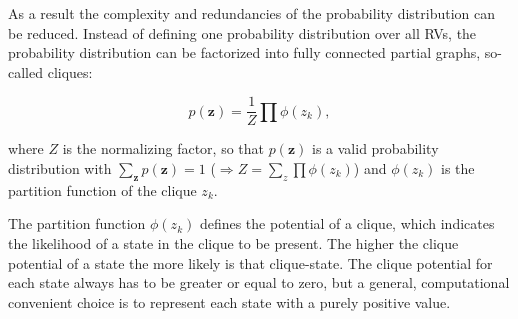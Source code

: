 As a result the complexity and redundancies of the probability distribution can be reduced. Instead of defining one probability distribution over all RVs, the probability distribution can be factorized into fully connected partial graphs, so-called cliques:

\[
p(\textbf{z}) = \frac{1}{Z} \prod \phi (z_k)  ,
\]

where $Z$ is the normalizing factor, so that $p(\textbf{z})$ is a valid probability distribution with $\sum_{\textbf{z}} p(\textbf{z}) = 1$ ($ \Rightarrow Z = \sum_z \prod \phi (z_k) $) and $\phi (z_k)$ is the partition function of the clique $z_k$.

The partition function $\phi (z_k)$ defines the potential of a clique, which indicates the likelihood of a state in the clique to be present.
The higher the clique potential of a state the more likely is that clique-state.
The clique potential for each state always has to be greater or equal to zero, but a general, computational convenient choice is to represent each state with a purely positive value.

